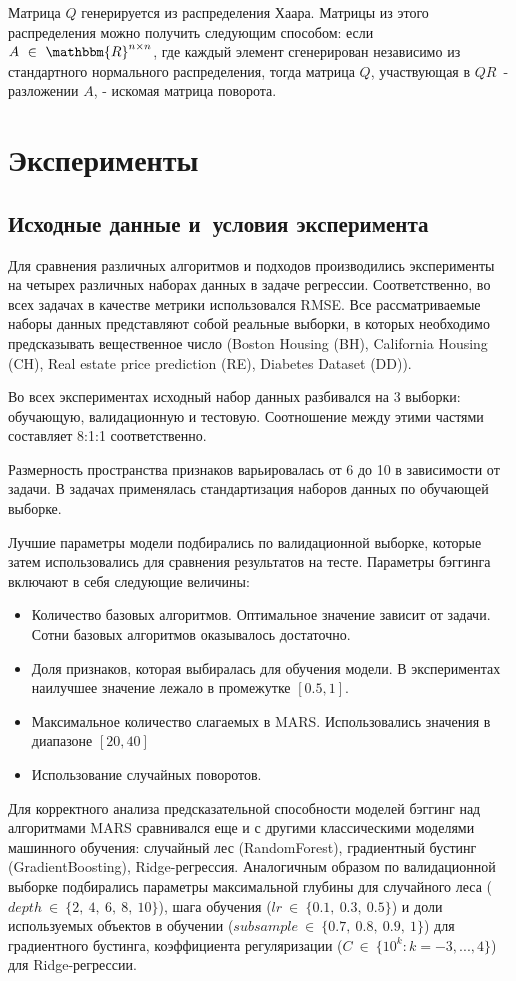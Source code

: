 \documentclass{article}
\begin{document}
Матрица $Q$ генерируется из распределения Хаара. Матрицы из этого распределения можно получить следующим способом: если $A~\in~\mathbbm{R}^{n \times n}$, где каждый элемент сгенерирован независимо из стандартного нормального распределения, тогда матрица $Q$, участвующая в $QR$~-разложении $A$, - искомая матрица поворота.


\section{Эксперименты}
\subsection{Исходные данные и~условия эксперимента}
 
Для сравнения различных алгоритмов и подходов производились эксперименты на четырех различных наборах данных в задаче регрессии. Соответственно, во всех задачах в качестве метрики использовался RMSE.
Все рассматриваемые наборы данных представляют собой реальные выборки, в которых необходимо предсказывать вещественное число (Boston Housing (BH), California Housing (CH), Real estate price prediction (RE), Diabetes Dataset (DD)).

Во всех экспериментах исходный набор данных разбивался на 3 выборки:
обучающую, валидационную и тестовую. Соотношение между этими частями составляет 8:1:1 соответственно.

Размерность пространства признаков варьировалась от 6 до 10 в зависимости от задачи. В задачах применялась стандартизация наборов данных по обучающей выборке. 

Лучшие параметры модели подбирались по валидационной выборке, которые затем использовались для сравнения результатов на тесте.
Параметры бэггинга включают в себя следующие величины:
\begin{itemize}
    \item Количество базовых алгоритмов. Оптимальное значение зависит от задачи. Сотни базовых алгоритмов оказывалось достаточно.
    \item Доля признаков, которая выбиралась для обучения модели. В экспериментах наилучшее значение лежало в промежутке $[0.5, 1]$.
    \item Максимальное количество слагаемых в MARS. Использовались значения в диапазоне $[20, 40]$
    \item Использование случайных поворотов.
\end{itemize}

Для корректного анализа предсказательной способности моделей бэггинг над алгоритмами MARS сравнивался еще и с другими классическими моделями машинного обучения: случайный лес (RandomForest), градиентный бустинг (GradientBoosting), Ridge-регрессия. Аналогичным образом по валидационной выборке подбирались параметры максимальной глубины для случайного леса ($depth~\in~\{2,~4,~6,~8,~10\}$), шага обучения
($lr~\in~\{0.1,~0.3,~0.5\}$) и доли используемых объектов в обучении
($subsample~\in~\{0.7,~0.8,~0.9,~1\}$) для градиентного бустинга, коэффициента регуляризации ($C~\in~\{10^k:k=-3,...,4\}$) для Ridge-регрессии. 
\end{document}
